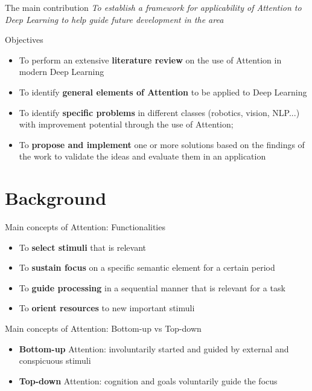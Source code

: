 \documentclass[10pt]{beamer}
\begin{document}
\begin{frame}{The main contribution}
    \centering
    \textit{
        To establish a framework for applicability of Attention to Deep Learning
        to help guide future development in the area}
\end{frame}

\begin{frame}{Objectives}
    \begin{itemize}
        \item To perform an extensive \textbf{literature review} on the use of Attention
            in modern Deep Learning
        \item To identify \textbf{general elements of Attention} to be applied to Deep Learning
        \item To identify \textbf{specific problems} in different classes
            (robotics, vision, NLP...) with improvement potential through the use of Attention;
        \item To \textbf{propose and implement} one or more solutions based on the findings of the work
            to validate the ideas and evaluate them in an application
    \end{itemize}
\end{frame}

\section{Background}

\begin{frame}{Main concepts of Attention: Functionalities}
    \begin{itemize}
        \item To \textbf{select stimuli} that is relevant
        \item To \textbf{sustain focus} on a specific semantic element for a certain period
        \item To \textbf{guide processing} in a sequential manner that is relevant for a task
        \item To \textbf{orient resources} to new important stimuli
    \end{itemize}
\end{frame}

\begin{frame}{Main concepts of Attention: Bottom-up vs Top-down}
    \begin{itemize}
        \item \textbf{Bottom-up} Attention: involuntarily started and guided by external and conspicuous stimuli
        \item \textbf{Top-down} Attention: cognition and goals voluntarily guide the focus
    \end{itemize}
\end{frame}
\end{document}
